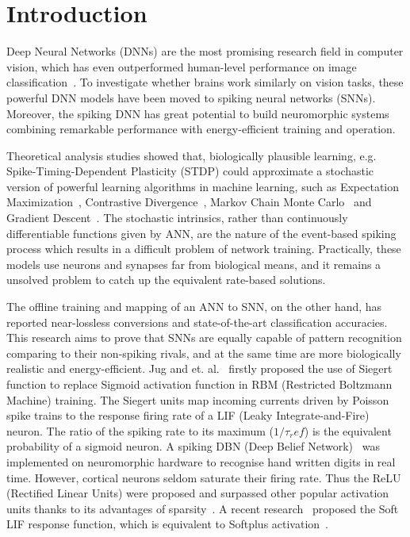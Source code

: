 \documentclass[runningheads,a4paper]{llncs}
\begin{document}
\section{Introduction}

Deep Neural Networks (DNNs) are the most promising research field in computer vision, which has even outperformed human-level performance on image classification~\cite{he2015delving}.
To investigate whether brains work similarly on vision tasks, these powerful DNN models have been moved to spiking neural networks (SNNs).
Moreover, the spiking DNN has great potential to build neuromorphic systems combining remarkable performance with energy-efficient training and operation.

Theoretical analysis studies showed that, biologically plausible learning, e.g. Spike-Timing-Dependent Plasticity (STDP) could approximate a stochastic version of powerful learning algorithms in machine learning, such as Expectation Maximization~\cite{nessler2013bayesian}, Contrastive Divergence~\cite{neftci2013event}, Markov Chain Monte Carlo~\cite{buesing2011neural} and Gradient Descent~\cite{o2016deep}.
The stochastic intrinsics, rather than continuously differentiable functions given by ANN, are the nature of the event-based spiking process which results in a difficult problem of network training.
Practically, these models use neurons and synapses far from biological means, and it remains a unsolved problem to catch up the equivalent rate-based solutions.
 
The offline training and mapping of an ANN to SNN, on the other hand, has reported near-lossless conversions and state-of-the-art classification accuracies.
This research aims to prove that SNNs are equally capable of pattern recognition comparing to their non-spiking rivals, and at the same time are more biologically realistic and energy-efficient.
Jug and et. al.~\cite{Jug_etal_2012} firstly proposed the use of Siegert function to replace Sigmoid activation function in RBM (Restricted Boltzmann Machine) training.
The Siegert units map incoming currents driven by Poisson spike trains to the response firing rate of a LIF (Leaky Integrate-and-Fire) neuron.
The ratio of the spiking rate to its maximum ($1/\tau_ref$) is the equivalent probability of a sigmoid neuron.
A spiking DBN (Deep Belief Network)~\cite{o2013real} was implemented on neuromorphic hardware to recognise hand written digits in real time.
However, cortical neurons seldom saturate their firing rate.
Thus the ReLU (Rectified Linear Units) were proposed and surpassed other popular activation units thanks to its advantages of sparsity~\cite{glorot2011deep}.
A recent research~\cite{hunsberger2015spiking} proposed the Soft LIF response function, which is equivalent to Softplus activation~\cite{dugas2001incorporating}.
\end{document}
